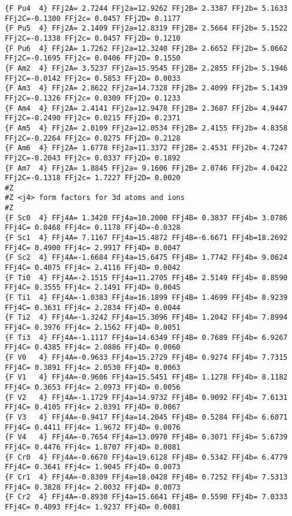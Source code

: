 {\begin{verbatim}
{F Pu4  4} FFj2A= 2.7244 FFj2a=12.9262 FFj2B= 2.3387 FFj2b= 5.1633 FFj2C=-0.1300 FFj2c= 0.0457 FFj2D= 0.1177 
{F Pu5  4} FFj2A= 2.1409 FFj2a=12.8319 FFj2B= 2.5664 FFj2b= 5.1522 FFj2C=-0.1338 FFj2c= 0.0457 FFj2D= 0.1210 
{F Pu6  4} FFj2A= 1.7262 FFj2a=12.3240 FFj2B= 2.6652 FFj2b= 5.0662 FFj2C=-0.1695 FFj2c= 0.0406 FFj2D= 0.1550 
{F Am2  4} FFj2A= 3.5237 FFj2a=15.9545 FFj2B= 2.2855 FFj2b= 5.1946 FFj2C=-0.0142 FFj2c= 0.5853 FFj2D= 0.0033 
{F Am3  4} FFj2A= 2.8622 FFj2a=14.7328 FFj2B= 2.4099 FFj2b= 5.1439 FFj2C=-0.1326 FFj2c= 0.0309 FFj2D= 0.1233 
{F Am4  4} FFj2A= 2.4141 FFj2a=12.9478 FFj2B= 2.3687 FFj2b= 4.9447 FFj2C=-0.2490 FFj2c= 0.0215 FFj2D= 0.2371 
{F Am5  4} FFj2A= 2.0109 FFj2a=12.0534 FFj2B= 2.4155 FFj2b= 4.8358 FFj2C=-0.2264 FFj2c= 0.0275 FFj2D= 0.2128 
{F Am6  4} FFj2A= 1.6778 FFj2a=11.3372 FFj2B= 2.4531 FFj2b= 4.7247 FFj2C=-0.2043 FFj2c= 0.0337 FFj2D= 0.1892 
{F Am7  4} FFj2A= 1.8845 FFj2a= 9.1606 FFj2B= 2.0746 FFj2b= 4.0422 FFj2C=-0.1318 FFj2c= 1.7227 FFj2D= 0.0020 
#Z
#Z <j4> form factors for 3d atoms and ions
#Z
{F Sc0  4} FFj4A= 1.3420 FFj4a=10.2000 FFj4B= 0.3837 FFj4b= 3.0786 FFj4C= 0.0468 FFj4c= 0.1178 FFj4D=-0.0328 
{F Sc1  4} FFj4A= 7.1167 FFj4a=15.4872 FFj4B=-6.6671 FFj4b=18.2692 FFj4C= 0.4900 FFj4c= 2.9917 FFj4D= 0.0047 
{F Sc2  4} FFj4A=-1.6684 FFj4a=15.6475 FFj4B= 1.7742 FFj4b= 9.0624 FFj4C= 0.4075 FFj4c= 2.4116 FFj4D= 0.0042 
{F Ti0  4} FFj4A=-2.1515 FFj4a=11.2705 FFj4B= 2.5149 FFj4b= 8.8590 FFj4C= 0.3555 FFj4c= 2.1491 FFj4D= 0.0045 
{F Ti1  4} FFj4A=-1.0383 FFj4a=16.1899 FFj4B= 1.4699 FFj4b= 8.9239 FFj4C= 0.3631 FFj4c= 2.2834 FFj4D= 0.0044 
{F Ti2  4} FFj4A=-1.3242 FFj4a=15.3096 FFj4B= 1.2042 FFj4b= 7.8994 FFj4C= 0.3976 FFj4c= 2.1562 FFj4D= 0.0051 
{F Ti3  4} FFj4A=-1.1117 FFj4a=14.6349 FFj4B= 0.7689 FFj4b= 6.9267 FFj4C= 0.4385 FFj4c= 2.0886 FFj4D= 0.0060 
{F V0   4} FFj4A=-0.9633 FFj4a=15.2729 FFj4B= 0.9274 FFj4b= 7.7315 FFj4C= 0.3891 FFj4c= 2.0530 FFj4D= 0.0063 
{F V1   4} FFj4A=-0.9606 FFj4a=15.5451 FFj4B= 1.1278 FFj4b= 8.1182 FFj4C= 0.3653 FFj4c= 2.0973 FFj4D= 0.0056 
{F V2   4} FFj4A=-1.1729 FFj4a=14.9732 FFj4B= 0.9092 FFj4b= 7.6131 FFj4C= 0.4105 FFj4c= 2.0391 FFj4D= 0.0067 
{F V3   4} FFj4A=-0.9417 FFj4a=14.2045 FFj4B= 0.5284 FFj4b= 6.6071 FFj4C= 0.4411 FFj4c= 1.9672 FFj4D= 0.0076 
{F V4   4} FFj4A=-0.7654 FFj4a=13.0970 FFj4B= 0.3071 FFj4b= 5.6739 FFj4C= 0.4476 FFj4c= 1.8707 FFj4D= 0.0081 
{F Cr0  4} FFj4A=-0.6670 FFj4a=19.6128 FFj4B= 0.5342 FFj4b= 6.4779 FFj4C= 0.3641 FFj4c= 1.9045 FFj4D= 0.0073 
{F Cr1  4} FFj4A=-0.8309 FFj4a=18.0428 FFj4B= 0.7252 FFj4b= 7.5313 FFj4C= 0.3828 FFj4c= 2.0032 FFj4D= 0.0073 
{F Cr2  4} FFj4A=-0.8930 FFj4a=15.6641 FFj4B= 0.5590 FFj4b= 7.0333 FFj4C= 0.4093 FFj4c= 1.9237 FFj4D= 0.0081 

\end{verbatim}}
